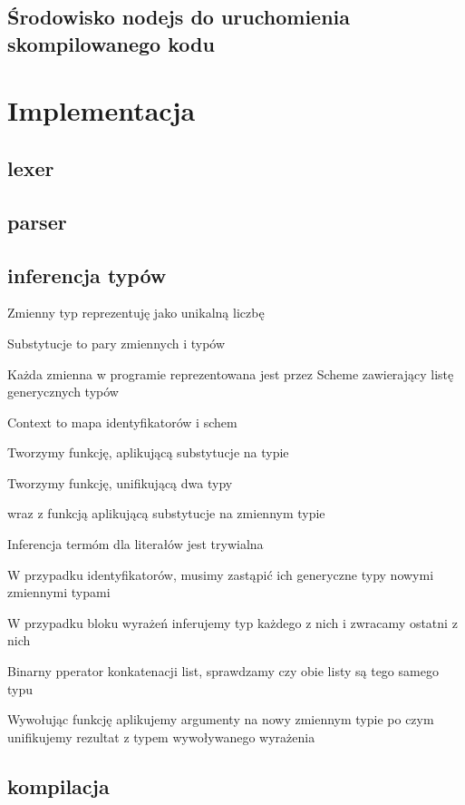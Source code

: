 \documentclass{article}
\begin{document}
\subsection{Środowisko nodejs do uruchomienia skompilowanego kodu}
\section{Implementacja}
\subsection{lexer}
\subsection{parser}
\subsection{inferencja typów}
Zmienny typ reprezentuję jako unikalną liczbę

Substytucje to pary zmiennych i typów

Każda zmienna w programie reprezentowana jest przez Scheme zawierający listę generycznych typów

Context to mapa identyfikatorów i schem

Tworzymy funkcję, aplikującą substytucje na typie

Tworzymy funkcję, unifikującą dwa typy

wraz z funkcją aplikującą substytucje na zmiennym typie

Inferencja termóm dla literałów jest trywialna

W przypadku identyfikatorów, musimy zastąpić ich generyczne typy nowymi zmiennymi typami

W przypadku bloku wyrażeń inferujemy typ każdego z nich i zwracamy ostatni z nich

Binarny pperator konkatenacji list, sprawdzamy czy obie listy są tego samego typu

Wywołując funkcję aplikujemy argumenty na nowy zmiennym typie po czym unifikujemy rezultat z typem wywoływanego wyrażenia


\subsection{kompilacja}
\end{document}
